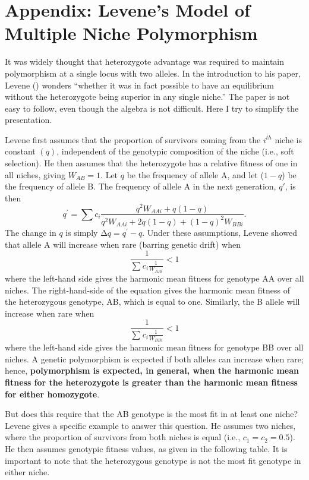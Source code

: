 \documentclass[
  american,
  letterpaper,
]{book}
\begin{document}
\section{Appendix: Levene's Model of Multiple Niche
Polymorphism}\label{sec-app-2}

It was widely thought that heterozygote advantage was required to
maintain polymorphism at a single locus with two alleles. In the
introduction to his paper, Levene ()
wonders ``whether it was in fact possible to have an equilibrium without
the heterozygote being superior in any single niche.'' The paper is not
easy to follow, even though the algebra is not difficult. Here I try to
simplify the presentation.

Levene first assumes that the proportion of survivors coming from the
\(i^{th}\) niche is constant \((q)\), independent of the genotypic
composition of the niche (i.e., soft selection). He then assumes that
the heterozygote has a relative fitness of one in all niches, giving
\(W_{AB} = 1\). Let \(q\) be the frequency of allele A, and let
(\(1 - q\)) be the frequency of allele B. The frequency of allele A in
the next generation, \(q'\), is then
\[q^{'} = \sum_{}^{}c_{i}\frac{q^{2}W_{AAi} + q(1 - q)}{q^{2}W_{AAi} + 2q(1 - q) + (1 - q)^{2}W_{BBi}}.\]
The change in \(q\) is simply \(\mathrm{\Delta}q = q^{'} - q\). Under
these assumptions, Levene showed that allele A will increase when rare
(barring genetic drift) when
\[\frac{1}{\sum_{}^{}{c_{i}\frac{1}{W_{AAi}}}} < 1\] where the left-hand
side gives the harmonic mean fitness for genotype AA over all niches.
The right-hand-side of the equation gives the harmonic mean fitness of
the heterozygous genotype, AB, which is equal to one. Similarly, the B
allele will increase when rare when
\[\frac{1}{\sum_{}^{}{c_{i}\frac{1}{W_{BBi}}}} < 1\] where the left-hand
side gives the harmonic mean fitness for genotype BB over all niches. A
genetic polymorphism is expected if both alleles can increase when rare;
hence, \textbf{polymorphism is expected, in general, when the harmonic
mean fitness for the heterozygote is greater than the harmonic mean
fitness for either homozygote}.

But does this require that the AB genotype is the most fit in at least
one niche? Levene gives a specific example to answer this question. He
assumes two niches, where the proportion of survivors from both niches
is equal (i.e., \(c_{1} = c_{2} = 0.5\)). He then assumes genotypic
fitness values, as given in the following table. It is important to note
that the heterozygous genotype is not the most fit genotype in either
niche.
\end{document}
